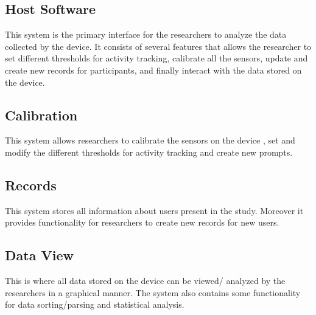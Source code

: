 \documentclass{article}
\begin{document}
	\subsection{Host Software}
		This system is the primary interface for the researchers to analyze the data collected by the device. It consists of several features that allows the researcher to set different 					
		thresholds for activity tracking, calibrate all the sensors, update and create new records for participants, and finally interact with the data stored on the device.

	\subsection{Calibration}
		This system allows researchers to calibrate the sensors on the device , set and modify the different thresholds for activity tracking and create new prompts. 

	\subsection{Records}
		This system stores all information about users present in the study. Moreover it provides functionality for researchers to create new records for new users.

	\subsection{Data View}
		This is where all data stored on the device can be viewed/ analyzed by the researchers in a graphical manner. The system also contains some functionality for data sorting/parsing and statistical analysis.
	
\end{document}
